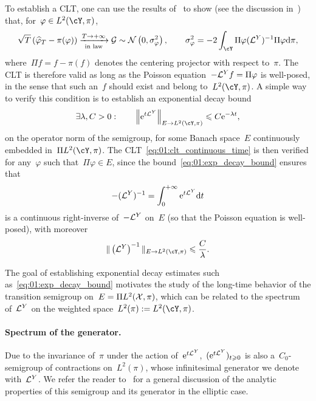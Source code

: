 To establish a CLT, one can use the results of~\cite{B82} to show (see the discussion in~\cite[Section 3.1]{LS16}) that, for~$\varphi\in L^2(\cY,\pi)$,
\begin{equation}
    \label{eq:01:clt_continuous_time}
    \sqrt{T}\left(\widehat{\varphi}_T - \pi(\varphi)\right) \xrightarrow[\text{in law}]{T\to+\infty}\mathcal G \sim \mathcal N\left(0,\sigma_\varphi^2\right),\qquad \sigma_{\varphi}^2 = -2\int_{\cY}\Pi\varphi(\cL^Y)^{-1} \Pi\varphi\d \pi,
\end{equation}
where~$\Pi f = f-\pi(f)$ denotes the centering projector with respect to~$\pi$.
The CLT is therefore valid as long as the Poisson equation~$-\mathcal{L}^Y f = \Pi\varphi$ is well-posed, in the sense that such an~$f$ should exist and belong to~$L^2(\cY,\pi)$. A simple way to verify this condition is to establish an exponential decay bound
    \begin{equation}
\label{eq:01:exp_decay_bound}
   \exists \lambda,C>0:\qquad \left\|\e^{t\cL^Y}\right\|_{E\to L^2(\cY,\pi)} \leq C\e^{-\lambda t},
\end{equation}
on the operator norm of the semigroup, for some Banach space~$E$ continuously embedded in~$\Pi L^2(\cY,\pi)$. The CLT~\eqref{eq:01:clt_continuous_time} is then verified for any~$\varphi$ such that~$\Pi\varphi\in E$, since the bound~\eqref{eq:01:exp_decay_bound} ensures that
\begin{equation}
    \label{eq:01:cL_inverse}
    -(\mathcal{L}^Y)^{-1}=\int_0^{+\infty} \mathrm{e}^{t\mathcal{L}^Y}\mathrm{d} t
\end{equation}
is a continuous right-inverse of~$-\mathcal{L}^Y$ on~$E$ (so that the Poisson equation is well-posed), with moreover
\begin{equation}
    \label{eq:01:cL_inverse_bound}
    \|\left(\cL^Y\right)^{-1}\|_{E\to L^2(\cY,\pi)} \leq \frac{C}{\lambda}.
\end{equation}

The goal of establishing exponential decay estimates such as~\eqref{eq:01:exp_decay_bound} motivates the study of the long-time behavior of the transition semigroup on~$E=\Pi L^2(\mathcal{X},\pi)$, which can be related to the spectrum of~$\mathcal{L}^Y$ on the weighted space~$L^2(\pi):=L^2(\cY,\pi)$.

\paragraph{Spectrum of the generator.}
Due to the invariance of~$\pi$ under the action of~$\mathrm{e}^{t\mathcal{L}^Y}$,~$(\mathrm{e}^{t\mathcal{L}^Y})_{t\geqslant 0}$ is also a~$C_0$-semigroup of contractions on~$L^2(\pi)$, whose infinitesimal generator we denote with~$\mathcal{L}^Y$.
We refer the reader to~\cite[Chapter 8]{LB06} for a general discussion of the analytic properties of this semigroup and its generator in the elliptic case.

